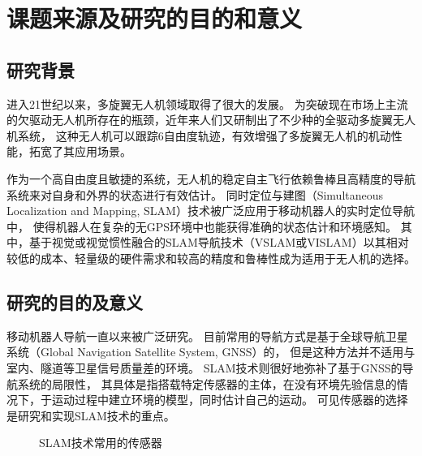 \section{课题来源及研究的目的和意义}
\subsection{研究背景}
进入21世纪以来，多旋翼无人机领域取得了很大的发展。
为突破现在市场上主流的欠驱动无人机所存在的瓶颈，近年来人们又研制出了不少种的全驱动多旋翼无人机系统，
这种无人机可以跟踪6自由度轨迹，有效增强了多旋翼无人机的机动性能，拓宽了其应用场景。

作为一个高自由度且敏捷的系统，无人机的稳定自主飞行依赖鲁棒且高精度的导航系统来对自身和外界的状态进行有效估计。
同时定位与建图（Simultaneous Localization and Mapping, SLAM）技术\cite{liu2016asurvey}被广泛应用于移动机器人的实时定位导航中，
使得机器人在复杂的无GPS环境中也能获得准确的状态估计和环境感知。
其中，基于视觉或视觉惯性融合的SLAM导航技术（VSLAM或VISLAM）以其相对较低的成本、轻量级的硬件需求和较高的精度和鲁棒性成为适用于无人机的选择。

\subsection{研究的目的及意义}
移动机器人导航一直以来被广泛研究。
目前常用的导航方式是基于全球导航卫星系统（Global Navigation Satellite System, GNSS）的，
但是这种方法并不适用与室内、隧道等卫星信号质量差的环境。
SLAM技术则很好地弥补了基于GNSS的导航系统的局限性，
其具体是指搭载特定传感器的主体，在没有环境先验信息的情况下，于运动过程中建立环境的模型，同时估计自己的运动\cite{davison2007monoslam}。
可见传感器的选择是研究和实现SLAM技术的重点。

\begin{figure}[!ht]
    \setlength{\subfigcapskip}{-1bp}
    \centering
    \begin{minipage}{\textwidth}

    \centering
    \subfigure{\label{subfig:rgbd_camera}}\addtocounter{subfigure}{-2}
    \subfigure{\label{subfig:imu}}\addtocounter{subfigure}{-2}
    \subfigure{\label{subfig:lidar}}\addtocounter{subfigure}{-2}

    \end{minipage}
    \caption{SLAM技术常用的传感器}
    \label{fig:common_sensors_for_slam}
\end{figure}

